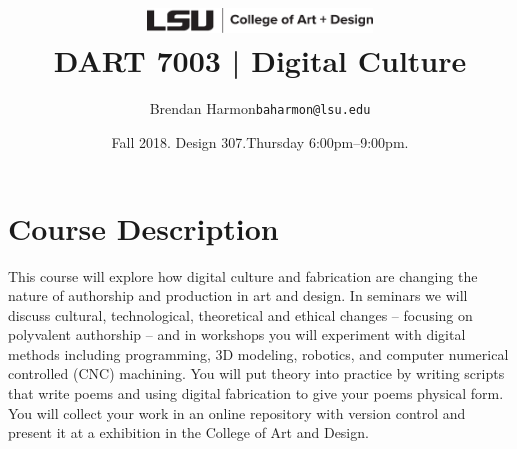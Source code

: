 \documentclass[11pt,article,oneside]{memoir}
\makeatletter
\def\myauthor{Author}
\def\mytitle{Title}
\def\myemail{baharmon@lsu.edu}
\def\myauthor{Brendan Harmon}
\def\mytitle{ \includegraphics[width=6cm]{../images/logos/lsu_art_design_logo.pdf} \\[0.1cm] {\normalfont \normalsize DART 7003 |} \Large Digital Culture}
\newcommand{\globalcolor}[1]{%
  \color{#1}\global\let\default@color\current@color
}
\makeatother
\begin{document}
\setlength\bibitemsep{0.75em}

\setmainfont[Scale=1, Path = fonts/lato/,BoldItalicFont=Lato-RegIta,BoldFont=Lato-Reg,ItalicFont=Lato-LigIta]{Lato-Lig}
\setsansfont[Scale=1, Path = fonts/lato/,BoldItalicFont=Lato-RegIta,BoldFont=Lato-Reg,ItalicFont=Lato-LigIta]{Lato-Lig}
\setmonofont[Mapping=tex-text,Scale=0.8,Path = fonts/inconsolata/]{i}

\def\ind{\hangindent=1 true cm\hangafter=1 \noindent}
\def\labelitemi{$\cdot$}

\title{\LARGE \mytitle}
\author{\Large\myauthor \newline \footnotesize\texttt{\noindent\myemail}}
\date{Fall 2018. Design 307.\newline Thursday 6:00pm--9:00pm.}
\published{\,}


\globalcolor{black}
\vspace*{-10em}
\maketitle
{} 
\clearpage


\globalcolor{black}

\vspace*{-10em}
\maketitle

\section{Course Description}
%
This course will explore 
how digital culture and fabrication
are changing the nature of authorship
and production in art and design.
%
In seminars we will discuss
cultural, technological, theoretical and ethical changes
-- focusing on polyvalent authorship -- 
and in workshops you will experiment 
with digital methods
including programming, 3D modeling, robotics,
and computer numerical controlled (CNC) machining.
%
You will put theory into practice
by writing scripts that write poems 
and using digital fabrication
to give your poems physical form.
You will collect your work 
in an online repository with version control
and present it at a exhibition
in the College of Art and Design.\\
\end{document}
